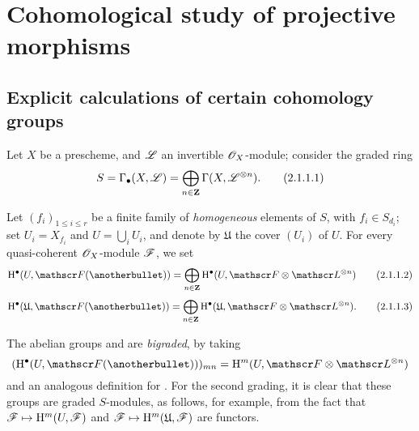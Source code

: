 \section{Cohomological study of projective morphisms}
\label{section:III.2}


\subsection{Explicit calculations of certain cohomology groups}
\label{subsection:III.2.1}

\begin{env}[2.1.1]
\label{III.2.1.1}
Let $X$ be a prescheme, and $\mathscr{L}$ an invertible $\mathscr{O}_X$-module;
consider the graded ring 
\[
\label{III.2.1.1.1}
  S = \Gamma_\bullet(X,\mathscr{L}) = \bigoplus_{n\in\mathbf{Z}}\Gamma(X,\mathscr{L}^{\otimes n}).
\tag{2.1.1.1}
\]

Let $(f_i)_{1\leq i\leq r}$ be a finite family of \emph{homogeneous} elements of $S$, with $f_i\in S_{d_i}$;
set $U_i=X_{f_i}$ and $U=\bigcup_i U_i$, and denote by $\mathfrak{U}$ the cover $(U_i)$ of $U$.
For every quasi-coherent $\mathscr{O}_X$-module $\mathscr{F}$, we set
\[
\label{III.2.1.1.2}
  \HH^\bullet(U,\sh{F}(\anotherbullet)) = \bigoplus_{n\in\bb{Z}}\HH^\bullet(U,\sh{F}\otimes\sh{L}^{\otimes n})
\tag{2.1.1.2}
\]
\[
\label{III.2.1.1.3}
  \HH^\bullet(\mathfrak{U},\sh{F}(\anotherbullet)) = \bigoplus_{n\in\bb{Z}}\HH^\bullet(\mathfrak{U},\sh{F}\otimes\sh{L}^{\otimes n}).
\tag{2.1.1.3}
\]

The abelian groups  and  are \emph{bigraded}, by taking
\[
  (\HH^\bullet(U,\sh{F}(\anotherbullet)))_{mn} = \HH^m(U,\sh{F}\otimes\sh{L}^{\otimes n})
\]
and an analogous definition for .
For the second grading, it is clear that these groups are graded $S$-modules, as follows, for example, from the fact that $\sh{F}\mapsto\HH^m(U,\sh{F})$ and $\sh{F}\mapsto\HH^m(\mathfrak{U},\sh{F})$ are functors.
\end{env}


